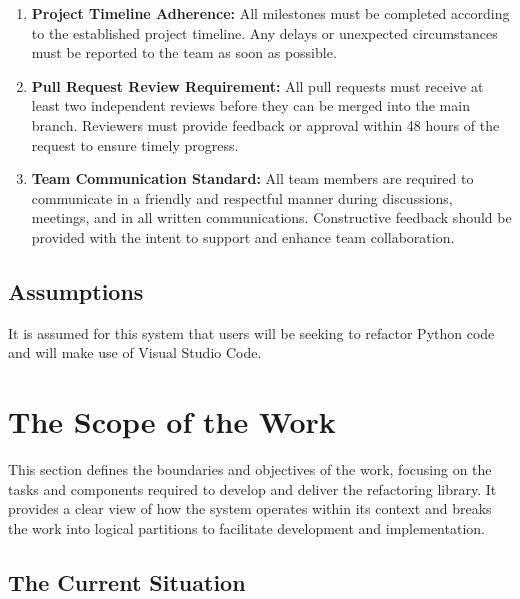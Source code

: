 \documentclass[12pt]{article}
\begin{document}
\begin{enumerate}
  \item \textbf{Project Timeline Adherence:} All milestones must be
    completed according to the established project timeline. Any
    delays or unexpected circumstances must be reported to the team
    as soon as possible.
  \item \textbf{Pull Request Review Requirement:} All pull requests
    must receive at least two independent reviews before they can be
    merged into the main branch. Reviewers must provide feedback or
    approval within 48 hours of the request to ensure timely progress.
  \item \textbf{Team Communication Standard:} All team members are
    required to communicate in a friendly and respectful manner
    during discussions, meetings, and in all written communications.
    Constructive feedback should be provided with the intent to
    support and enhance team collaboration.
\end{enumerate}

\subsection{Assumptions}
It is assumed for this system that users will be seeking to refactor
Python code and will make use of Visual Studio Code.

\section{The Scope of the Work}
This section defines the boundaries and objectives of the work,
focusing on the tasks and components required to develop and deliver
the refactoring library. It provides a clear view of how the system
operates within its context and breaks the work into logical
partitions to facilitate development and implementation.

\subsection{The Current Situation}
\end{document}
